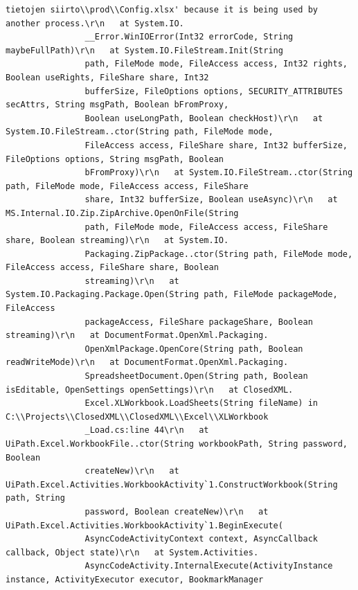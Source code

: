 \begin{Verbatim}[fontsize=\tiny]
                tietojen siirto\\prod\\Config.xlsx' because it is being used by another process.\r\n   at System.IO.
                __Error.WinIOError(Int32 errorCode, String maybeFullPath)\r\n   at System.IO.FileStream.Init(String
                path, FileMode mode, FileAccess access, Int32 rights, Boolean useRights, FileShare share, Int32
                bufferSize, FileOptions options, SECURITY_ATTRIBUTES secAttrs, String msgPath, Boolean bFromProxy,
                Boolean useLongPath, Boolean checkHost)\r\n   at System.IO.FileStream..ctor(String path, FileMode mode,
                FileAccess access, FileShare share, Int32 bufferSize, FileOptions options, String msgPath, Boolean
                bFromProxy)\r\n   at System.IO.FileStream..ctor(String path, FileMode mode, FileAccess access, FileShare
                share, Int32 bufferSize, Boolean useAsync)\r\n   at MS.Internal.IO.Zip.ZipArchive.OpenOnFile(String
                path, FileMode mode, FileAccess access, FileShare share, Boolean streaming)\r\n   at System.IO.
                Packaging.ZipPackage..ctor(String path, FileMode mode, FileAccess access, FileShare share, Boolean
                streaming)\r\n   at System.IO.Packaging.Package.Open(String path, FileMode packageMode, FileAccess
                packageAccess, FileShare packageShare, Boolean streaming)\r\n   at DocumentFormat.OpenXml.Packaging.
                OpenXmlPackage.OpenCore(String path, Boolean readWriteMode)\r\n   at DocumentFormat.OpenXml.Packaging.
                SpreadsheetDocument.Open(String path, Boolean isEditable, OpenSettings openSettings)\r\n   at ClosedXML.
                Excel.XLWorkbook.LoadSheets(String fileName) in C:\\Projects\\ClosedXML\\ClosedXML\\Excel\\XLWorkbook
                _Load.cs:line 44\r\n   at UiPath.Excel.WorkbookFile..ctor(String workbookPath, String password, Boolean
                createNew)\r\n   at UiPath.Excel.Activities.WorkbookActivity`1.ConstructWorkbook(String path, String
                password, Boolean createNew)\r\n   at UiPath.Excel.Activities.WorkbookActivity`1.BeginExecute(
                AsyncCodeActivityContext context, AsyncCallback callback, Object state)\r\n   at System.Activities.
                AsyncCodeActivity.InternalExecute(ActivityInstance instance, ActivityExecutor executor, BookmarkManager

\end{Verbatim}
